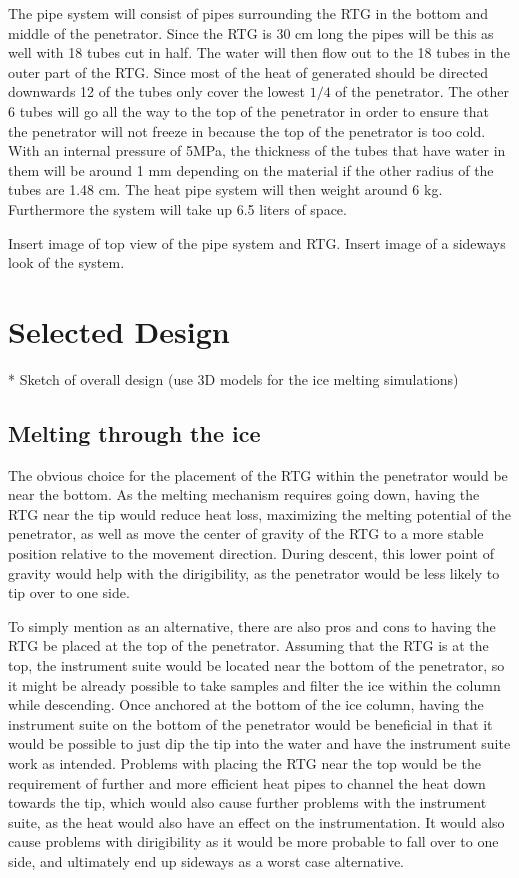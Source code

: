 \noindent
The pipe system will consist of pipes surrounding the RTG in the bottom and middle of the penetrator. Since the RTG is 30 cm long the pipes will be this as well with 18 tubes cut in half. The water will then flow out to the 18 tubes in the outer part of the RTG. Since most of the heat of generated should be directed downwards 12 of the tubes only cover the lowest $1/4$ of the penetrator. The other 6 tubes will go all the way to the top of the penetrator in order to ensure that the penetrator will not freeze in because the top of the penetrator is too cold. With an internal pressure of 5MPa, the thickness of the tubes that have water in them will be around 1 mm depending on the material if the other radius of the tubes are 1.48 cm. The heat pipe system will then weight around 6 kg. Furthermore the system will take up 6.5 liters of space. 

Insert image of top view of the pipe system and RTG. 
Insert image of a sideways look of the system.

\section{Selected Design}

* Sketch of overall design (use 3D models for the ice melting simulations)

\subsection{Melting through the ice} %

The obvious choice for the placement of the RTG within the penetrator would be near the bottom. As the melting mechanism requires going down, having the RTG near the tip would reduce heat loss, maximizing the melting potential of the penetrator, as well as move the center of gravity of the RTG to a more stable position relative to the movement direction. During descent, this lower point of gravity would help with the dirigibility, as the penetrator would be less likely to tip over to one side.

To simply mention as an alternative, there are also pros and cons to having the RTG be placed at the top of the penetrator. Assuming that the RTG is at the top, the instrument suite would be located near the bottom of the penetrator, so it might be already possible to take samples and filter the ice within the column while descending. Once anchored at the bottom of the ice column, having the instrument suite on the bottom of the penetrator would be beneficial in that it would be possible to just dip the tip into the water and have the instrument suite work as intended. Problems with placing the RTG near the top would be the requirement of further and more efficient heat pipes to channel the heat down towards the tip, which would also cause further problems with the instrument suite, as the heat would also have an effect on the instrumentation. It would also cause problems with dirigibility as it would be more probable to fall over to one side, and ultimately end up sideways as a worst case alternative. 

